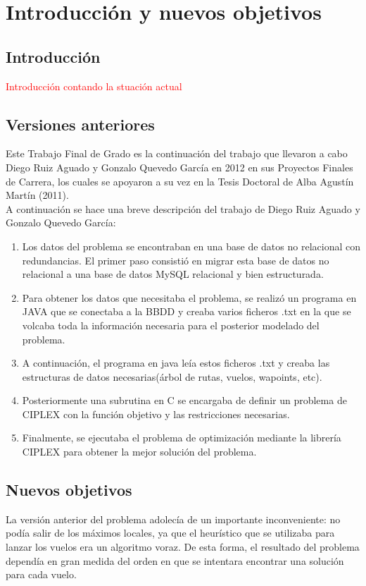 \chapter{Introducción y nuevos objetivos}

\section{Introducción}
\textcolor{red}{Introducción contando la stuación actual}


\section{Versiones anteriores}
Este Trabajo Final de Grado es la continuación del trabajo que llevaron a cabo Diego Ruiz Aguado y Gonzalo Quevedo García en 2012 en sus Proyectos Finales de Carrera, los cuales se apoyaron a su vez en la Tesis Doctoral de Alba Agustín  Martín (2011).\\

A continuación se hace una breve descripción del trabajo de  Diego Ruiz Aguado y Gonzalo Quevedo García:
\begin{enumerate}
	\item Los datos del problema se encontraban en una base de datos no relacional con redundancias. El primer paso consistió en migrar esta base de datos no relacional a una base de datos MySQL relacional y bien estructurada.
	\item Para obtener los datos que necesitaba el problema, se realizó un programa en JAVA que se conectaba a la BBDD y creaba varios ficheros .txt en la que se volcaba toda la información necesaria para el posterior modelado del problema.
	\item A continuación, el programa en java leía estos ficheros .txt y creaba las estructuras de datos necesarias(árbol de rutas, vuelos, wapoints, etc).
	\item Posteriormente una subrutina en C se encargaba de definir un problema de CIPLEX con la función objetivo y las restricciones necesarias.
	\item Finalmente, se ejecutaba el problema de optimización mediante la librería CIPLEX para obtener la mejor solución del problema.
\end{enumerate}


\section{Nuevos objetivos}
La versión anterior del problema adolecía de un importante inconveniente: no podía salir de los máximos locales, ya que el heurístico que se utilizaba para lanzar los vuelos era un algoritmo voraz. De esta forma, el resultado del problema dependía en gran medida del orden en que se intentara encontrar una solución para cada vuelo.\\

